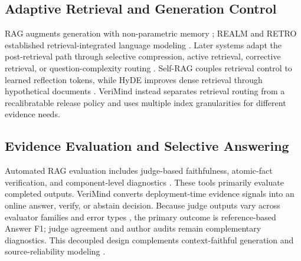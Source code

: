 \documentclass[smallextended]{svjour3}
\begin{document}
\subsection{Adaptive Retrieval and Generation Control}
RAG augments generation with non-parametric memory \citep{lewis2020retrieval}; REALM and RETRO established retrieval-integrated language modeling \citep{guu2020realm,borgeaud2022improving}. Later systems adapt the post-retrieval path through selective compression, active retrieval, corrective retrieval, or question-complexity routing \citep{xu2023recomp,jiang2023active,yan2024corrective,jeong-etal-2024-adaptive}. Self-RAG couples retrieval control to learned reflection tokens, while HyDE improves dense retrieval through hypothetical documents \citep{asai2023self,gao2022precise}. VeriMind instead separates retrieval routing from a recalibratable release policy and uses multiple index granularities for different evidence needs.

\subsection{Evidence Evaluation and Selective Answering}
Automated RAG evaluation includes judge-based faithfulness, atomic-fact verification, and component-level diagnostics \citep{zheng2023judging,es2024ragas,min2023factscore,saad2023ares,ru2024ragchecker}. These tools primarily evaluate completed outputs. VeriMind converts deployment-time evidence signals into an online answer, verify, or abstain decision. Because judge outputs vary across evaluator families and error types \citep{krishna-etal-2025-fact}, the primary outcome is reference-based Answer F1; judge agreement and author audits remain complementary diagnostics. This decoupled design complements context-faithful generation and source-reliability modeling \citep{zhang-etal-2025-faithfulrag,hwang-etal-2025-retrieval}.
\end{document}
